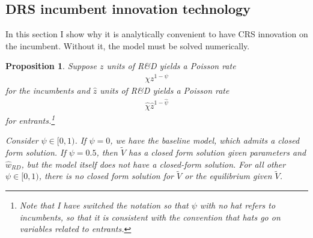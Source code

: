 \documentclass[11pt,english]{article}
\newtheorem{proposition}{Proposition}
\begin{document}
\subsection{DRS incumbent innovation technology}

In this section I show why it is analytically convenient to have CRS innovation on the incumbent. Without it, the model must be solved numerically.

\begin{proposition}
	Suppose $z$ units of R\&D yields a Poisson rate
	\begin{align}
	\chi z^{1-\psi}  
	\end{align}
	for the incumbents and $\hat{z}$ units of R\&D yields a Poisson rate 
	\begin{align}
	\hat{\chi}\hat{z}^{1-\hat{\psi}}
	\end{align}
	for entrants.\footnote{Note that I have switched the notation so that $\psi$ with no hat refers to incumbents, so that it is consistent with the convention that hats go on variables related to entrants.}
	
	Consider $\psi \in [0,1)$. If $\psi = 0$, we have the baseline model, which admits a closed form solution. If $\psi = 0.5$, then $\tilde{V}$ has a closed form solution given parameters and $\hat{w}_{RD}$, but the model itself does not have a closed-form solution. For all other $\psi \in [0,1)$, there is no closed form solution for $\tilde{V}$ or the equilibrium given $\tilde{V}$.  
\end{proposition}
\end{document}
